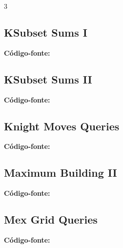 \documentclass[8pt]{extarticle}
\begin{document}
\begin{multicols*}{3}
\subsection{KSubset Sums I}
\begin{caixaenunciado}

\end{caixaenunciado}
\vspace{0.3cm}
\noindent\textbf{Código-fonte:}


\subsection{KSubset Sums II}
\begin{caixaenunciado}

\end{caixaenunciado}
\vspace{0.3cm}
\noindent\textbf{Código-fonte:}


\subsection{Knight Moves Queries}
\begin{caixaenunciado}

\end{caixaenunciado}
\vspace{0.3cm}
\noindent\textbf{Código-fonte:}


\subsection{Maximum Building II}
\begin{caixaenunciado}

\end{caixaenunciado}
\vspace{0.3cm}
\noindent\textbf{Código-fonte:}


\subsection{Mex Grid Queries}
\begin{caixaenunciado}

\end{caixaenunciado}
\vspace{0.3cm}
\noindent\textbf{Código-fonte:}



\end{multicols*}
\end{document}
